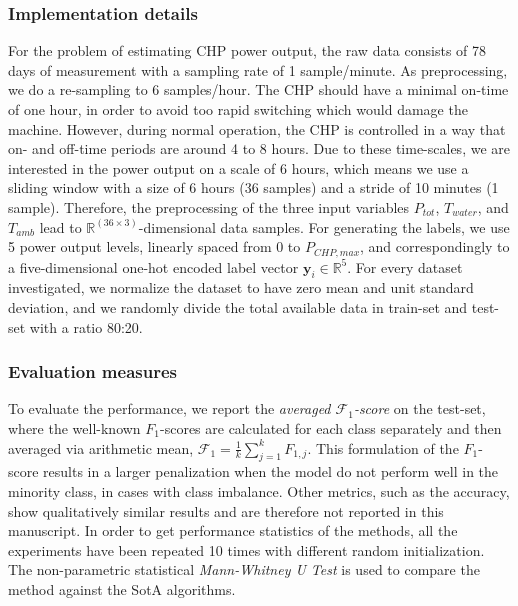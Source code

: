 \documentclass[runningheads, envcountsame, a4paper]{llncs}
\begin{document}
\subsubsection{Implementation details}
For the problem of estimating CHP power output, the raw data consists of 78 days of measurement with a sampling rate of 1 sample/minute.
As preprocessing, we do a re-sampling to 6 samples/hour.
The CHP should have a minimal on-time of one hour, in order to avoid too rapid switching which would damage the machine. 
However, during normal operation, the CHP is controlled in a way that on- and off-time periods are  around 4 to 8 hours. 
Due to these time-scales, we are interested in the power output on a scale of 6 hours, which means we use a sliding window with a size of 6 hours (36 samples) and a stride of 10 minutes (1 sample).
Therefore, the preprocessing of the three input variables  $P_{tot}$, $T_{water}$, and  $T_{amb}$ lead to $\mathbb{R}^{(36 \times 3)}$-dimensional data samples.
For generating the labels, we use 5 power output levels, linearly spaced from 0 to $P_{CHP,max}$, and correspondingly to a five-dimensional one-hot encoded label vector $\bm{y}_i\in \mathbb{R}^5$.
For every dataset investigated, we normalize the dataset to have zero mean and unit standard deviation, and we randomly divide the total available data in train-set and test-set with a ratio 80:20.


\subsubsection{Evaluation measures}
 
To evaluate the performance, we report the \textit{averaged $\mathcal{F}_1$-score} on the test-set, where the well-known $F_1$-scores are calculated for each class separately and then averaged via arithmetic mean, 
$\mathcal{F}_1 = \frac{1}{k} \sum_{j=1}^{k} F_{1,j} $.
This formulation of the $F_1$-score results in a larger penalization when the model do not perform well in the minority class, in cases with class imbalance. 
Other metrics, such as the accuracy, show qualitatively similar results and are therefore not reported in this manuscript.
In order to get performance statistics of the methods,
all the experiments have been repeated 10 times with different random initialization. The non-parametric statistical  \textit{Mann-Whitney  U  Test} \cite{mcknight2010mann}
is used to compare the \acrshort{method} against the SotA algorithms.
\end{document}
